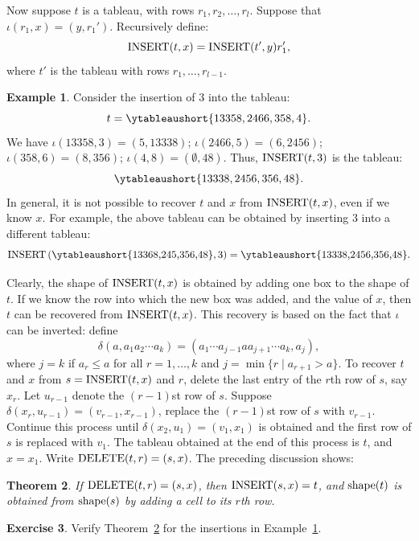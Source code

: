 \documentclass[11pt]{amsproc}
\newtheorem{theorem}{Theorem}[subsection]
\theoremstyle{definition}
\theoremstyle{example}
\newtheorem{example}[theorem]{Example}
\newtheorem{exercise}[theorem]{Exercise}
\newcommand{\rins}{\iota}
\newcommand{\ins}{\textup{INSERT}}
\newcommand{\del}{\textup{DELETE}}
\newcommand{\rdel}{\delta}
\newcommand{\shape}{\textup{shape}}
\begin{document}
Now suppose $t$ is a tableau, with rows $r_1,r_2,\dotsc, r_l$.
Suppose that $\rins(r_1,x) = (y, r_1')$.
Recursively define:
\begin{displaymath}
  \ins(t, x) = \ins(t', y) r_1',
\end{displaymath}
where $t'$ is the tableau with rows $r_1,\dotsc,r_{l-1}$.
\begin{example}
  \label{example:insertion}
  Consider the insertion of $3$ into the tableau:
  \begin{displaymath}
    t = \ytableaushort{13358,2466,358,4}.
  \end{displaymath}
  We have $\rins(13358,3) = (5,13338)$; $\rins(2466,5)=(6,2456)$; $\rins(358,6)=(8,356)$; $\rins(4,8)=(\emptyset,48)$.
  Thus, $\ins(t, 3)$ is the tableau:
  \begin{displaymath}
    \ytableaushort{13338,2456,356,48}.
  \end{displaymath}
In general, it is not possible to recover $t$ and $x$ from $\ins(t,x)$, even if we know $x$.
For example, the above tableau can be obtained by inserting $3$ into a different tableau:
\begin{displaymath}
  \ins\left(\vcenter{\hbox{\ytableaushort{13368,245,356,48}}}, 3\right) = \vcenter{\hbox{\ytableaushort{13338,2456,356,48}}}.
\end{displaymath}
\end{example}
Clearly, the shape of $\ins(t,x)$ is obtained by adding one box to the shape of $t$.
If we know the row into which the new box was added, and the value of $x$, then $t$ can be recovered from $\ins(t,x)$.
This recovery is based on the fact that $\rins$ can be inverted:
define
\begin{displaymath}
  \rdel(a, a_1a_2\dotsb a_k) = (a_1\dotsb a_{j-1}aa_{j+1}\dotsb a_k, a_j),
\end{displaymath}
where $j=k$ if $a_r\leq a$ for all $r=1,\dotsc, k$ and $j = \min\{r\mid a_{r+1}>a\}$.
To recover $t$ and $x$ from $s=\ins(t,x)$ and $r$, delete the last entry of the $r$th row of $s$, say $x_r$.
Let $u_{r-1}$ denote the $(r-1)$st row of $s$.
Suppose $\rdel(x_r,u_{r-1}) = (v_{r-1},x_{r-1})$, replace the $(r-1)$st row of $s$ with $v_{r-1}$.
Continue this process until $\rdel(x_2,u_1)=(v_1,x_1)$ is obtained and the first row of $s$ is replaced with $v_1$.
The tableau obtained at the end of this process is $t$, and $x=x_1$.
Write $\del(t,r)=(s,x)$.
The preceding discussion shows:
\begin{theorem}
  \label{theorem:del-ins}
  If $\del(t,r)=(s,x)$, then $\ins(s,x)=t$, and $\shape(t)$ is obtained from $\shape(s)$ by adding a cell to its $r$th row.
\end{theorem}
\begin{exercise}
  Verify Theorem~\ref{theorem:del-ins} for the insertions in Example~\ref{example:insertion}.
\end{exercise}
\end{document}
